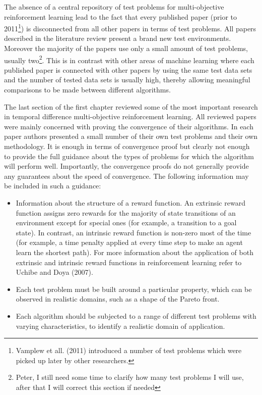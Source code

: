 The absence of a central repository of test problems for multi-objective reinforcement learning lead to the fact that every published paper (prior to 2011\footnote{Vamplew et all. (2011)\nocite{vamplew2011empirical} introduced a number of test problems which were picked up later by other researchers.}) is disconnected from all other papers in terms of test problems. All papers described in the literature review present a brand new test environments. Moreover the majority of the papers use only a small amount of test problems, usually two\footnote{Peter, I still need some time to clarify how many test problems I will use, after that I will correct this section if needed}. This is in contrast with other areas of machine learning where each published paper is connected with other papers by using the same test data sets and the number of tested data sets is usually high, thereby allowing meaningful comparisons to be made between different algorithms.

The last section of the first chapter reviewed some of the most important research in temporal difference multi-objective reinforcement learning. All reviewed papers were mainly concerned with proving the convergence of their algorithms. In each paper authors presented a small number of their own test problems and their own methodology. It is enough in terms of convergence proof but clearly not enough to provide the full guidance about the types of problems for which the algorithm will perform well. Importantly, the convergence proofs do not generally provide any guarantees about the speed of convergence. The following information may be included in such a guidance:
\begin{itemize}
  \item Information about the structure of a reward function. An extrinsic reward function assigns zero rewards for the majority of state transitions of an environment except for special ones (for example, a transition to a goal state). In contrast, an intrinsic reward function is non-zero most of the time (for example, a time penalty applied at every time step to make an agent learn the shortest path). For more information about the application of both extrinsic and intrinsic reward functions in reinforcement learning refer to Uchibe and Doya (2007)\nocite{Uchibe2007}.
  \item Each test problem must be built around a particular property, which can be observed in realistic domains, such as a shape of the Pareto front.
  \item Each algorithm should be subjected to a range of different test problems with varying characteristics, to identify a realistic domain of application.
\end{itemize}

